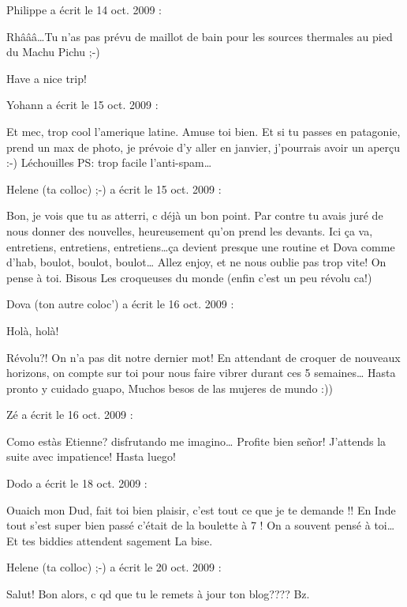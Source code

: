 \medskip
Philippe a écrit le 14 oct. 2009 :
\begin{displayquote}
Rhâââ\dots Tu n'as pas prévu de maillot de bain pour les sources thermales au pied du Machu Pichu ;-)

Have a nice trip!
\end{displayquote}

\medskip
Yohann a écrit le 15 oct. 2009 :
\begin{displayquote}
Et mec, trop cool l'amerique latine. Amuse toi bien. Et si tu passes en patagonie, prend un max de photo, je prévoie d'y aller en janvier, j'pourrais avoir un aperçu :-)
Léchouilles
PS: trop facile l'anti-spam\dots
\end{displayquote}

\medskip
Helene (ta colloc) ;-) a écrit le 15 oct. 2009 :
\begin{displayquote}
Bon, je vois que tu as atterri, c déjà un bon point.
Par contre tu avais juré de nous donner des nouvelles, heureusement qu'on prend les devants.
Ici ça va, entretiens, entretiens, entretiens\dots ça devient presque une routine et Dova comme d'hab, boulot, boulot, boulot\dots
Allez enjoy, et ne nous oublie pas trop vite!
On pense à toi.
Bisous
Les croqueuses du monde (enfin c'est un peu révolu ca!)
\end{displayquote}

\medskip
Dova (ton autre coloc') a écrit le 16 oct. 2009 :
\begin{displayquote}
Holà, holà!

Révolu?! On n'a pas dit notre dernier mot!
En attendant de croquer de nouveaux horizons, on compte sur toi pour nous faire vibrer durant ces 5 semaines\dots
Hasta pronto y cuidado guapo,
Muchos besos de las mujeres de mundo :))
\end{displayquote}

\medskip
Zé a écrit le 16 oct. 2009 :
\begin{displayquote}
Como estàs Etienne? disfrutando me imagino\dots
Profite bien señor! J'attends la suite avec impatience!
Hasta luego!
\end{displayquote}

\medskip
Dodo a écrit le 18 oct. 2009 :
\begin{displayquote}
Ouaich mon Dud, fait toi bien plaisir, c'est tout ce que je te demande !! En Inde tout s'est super bien passé c'était de la boulette à 7 ! On a souvent pensé à toi\dots Et tes biddies attendent sagement
La bise.
\end{displayquote}

\medskip
Helene (ta colloc) ;-) a écrit le 20 oct. 2009 :
\begin{displayquote}
Salut!
Bon alors, c qd que tu le remets à jour ton blog????
Bz.
\end{displayquote}

\vfill
